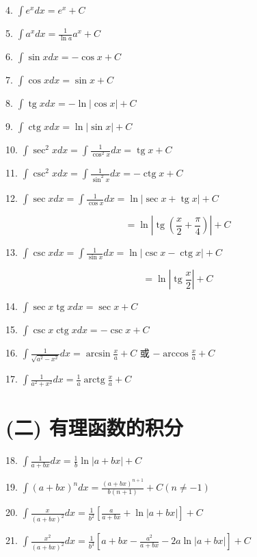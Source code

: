 \documentclass[10pt]{article}
\begin{document}
4. \(\int {e}^{x}{dx} = {e}^{x} + C\)

5. \(\int {a}^{x}{dx} = \frac{1}{\ln a}{a}^{x} + C\)

6. \(\int \sin {xdx} = - \cos x + C\)

7. \(\int \cos {xdx} = \sin x + C\)

8. \(\int \operatorname{tg}{xdx} = - \ln \left| {\cos x}\right| + C\)

9. \(\int \operatorname{ctg}{xdx} = \ln \left| {\sin x}\right| + C\)

10. \(\int {\sec }^{2}{xdx} = \int \frac{1}{{\cos }^{2}x}{dx} = \operatorname{tg}x + C\)

11. \(\int {\csc }^{2}{xdx} = \int \frac{1}{{\sin }^{2}x}{dx} = - \operatorname{ctg}x + C\)

12. \(\int \sec {xdx} = \int \frac{1}{\cos x}{dx} = \ln \left| {\sec x + \operatorname{tg}x}\right| + C\)

\[
= \ln \left| {\operatorname{tg}\left( {\frac{x}{2} + \frac{\pi }{4}}\right) }\right| + C
\]

13. \(\int \csc {xdx} = \int \frac{1}{\sin x}{dx} = \ln \left| {\csc x - \operatorname{ctg}x}\right| + C\)

\[
= \ln \left| {\operatorname{tg}\frac{x}{2}}\right| + C
\]

14. \(\int \sec x\operatorname{tg}{xdx} = \sec x + C\)

15. \(\int \csc x\operatorname{ctg}{xdx} = - \csc x + C\)

16. \(\int \frac{1}{\sqrt{{a}^{2} - {x}^{2}}}{dx} = \arcsin \frac{x}{a} + C\) 或 \(- \arccos \frac{x}{a} + C\)

17. \(\int \frac{1}{{a}^{2} + {x}^{2}}{dx} = \frac{1}{a}\operatorname{arctg}\frac{x}{a} + C\)

\section*{(二) 有理函数的积分}

18. \(\int \frac{1}{a + {bx}}{dx} = \frac{1}{b}\ln \left| {a + {bx}}\right| + C\)

19. \(\int {\left( a + bx\right) }^{n}{dx} = \frac{{\left( a + bx\right) }^{n + 1}}{b\left( {n + 1}\right) } + C\left( {n \neq - 1}\right)\)

20. \(\int \frac{x}{{\left( a + bx\right) }^{2}}{dx} = \frac{1}{{b}^{2}}\left\lbrack {\frac{a}{a + {bx}} + \ln \left| {a + {bx}}\right| }\right\rbrack + C\)

21. \(\int \frac{{x}^{2}}{{\left( a + bx\right) }^{2}}{dx} = \frac{1}{{b}^{3}}\left\lbrack {a + {bx} - \frac{{a}^{2}}{a + {bx}} - {2a}\ln \left| {a + {bx}}\right| }\right\rbrack + C\)
\end{document}
